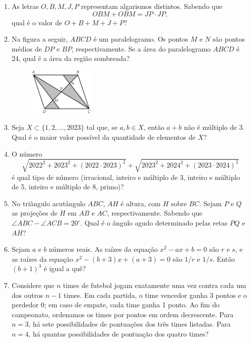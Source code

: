 \documentclass[12pt]{article}
\begin{document}
\begin{enumerate}[label=\textbf{\arabic*.}]
        \item As letras \(O, B, M, J, P\) representam algarismos distintos. Sabendo que
          \[
            OBM + OBM = JP \cdot JP,
          \]
          qual é o valor de \(O+B+M+J+P\)?
        \item Na figura a seguir, \(ABCD\) é um paralelogramo. Os pontos \(M\) e \(N\) são pontos médios de \(DP\) e \(BP\), respectivamente.
          Se a área do paralelogramo \(ABCD\) é 24, qual é a área da região sombreada?
          \begin{figure}[h]
            \centering
            \includegraphics[width=0.3\textwidth]{second.png}
          \end{figure}
        \item Seja \(X\subset\{1,2,\dots,2023\}\) tal que, se \(a,b\in X\), então \(a+b\) não é múltiplo de 3. Qual é o maior valor possível
          da quantidade de elementos de \(X\)?
        \item O número
          \[
            \sqrt{2022^2 + 2023^2 + (2022\cdot2023)^2} + \sqrt{2023^2 + 2024^2 + (2023\cdot2024)^2}
          \]
          é qual tipo de número (irracional, inteiro e múltiplo de 3, inteiro e múltiplo de 5, inteiro e múltiplo de 8, primo)?
        \item No triângulo acutângulo \(ABC\), \(AH\) é altura, com \(H\) sobre \(BC\). Sejam \(P\) e \(Q\) as projeções de \(H\) em \(AB\)
          e \(AC\), respectivamente. Sabendo que \(\angle ABC - \angle ACB = 20^\circ\). Qual é o ângulo agudo determinado pelas retas \(PQ\)
          e \(AH\)?
        \item Sejam \(a\) e \(b\) números reais. As raízes da equação \(x^2 - a x + b = 0\) são \(r\) e \(s\), e as raízes da equação
          \(x^2 - (b+3)x + (a+3) = 0\) são \(1/r\) e \(1/s\). Então \((b+1)^3\) é igual a quê?
        \item Considere que \(n\) times de futebol jogam exatamente uma vez contra cada um dos outros \(n-1\) times. Em cada partida, o time 
          vencedor ganha 3 pontos e o perdedor 0; em caso de empate, cada time ganha 1 ponto. Ao fim do campeonato, ordenamos os times por 
          pontos em ordem decrescente. Para \(n=3\), há sete possibilidades de pontuações dos três times listadas. Para \(n=4\), há quantas
          possibilidades de pontuação dos quatro times?
      \end{enumerate}
\end{document}
